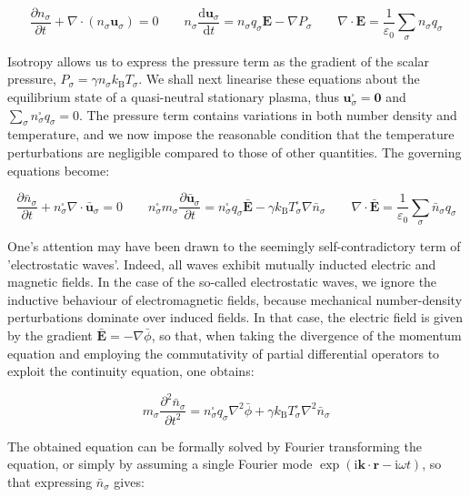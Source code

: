 \begin{equation}
    \frac{\partial n_\sigma}{\partial t}+\nabla\cdot(n_\sigma\mathbf{u}_\sigma)=0\qquad n_\sigma\frac{\mathrm{d}\mathbf{u}_\sigma}{\mathrm{d}t}=n_\sigma q_\sigma\mathbf{E}-\nabla P_\sigma\qquad\nabla\cdot\mathbf{E}=\frac{1}{\varepsilon_0}\sum_{\sigma}n_\sigma q_\sigma
\end{equation}

Isotropy allows us to express the pressure term as the gradient of the scalar pressure, $P_\sigma=\gamma n_\sigma k_\mathrm{B}T_\sigma$. We shall next linearise these equations about the equilibrium state of a quasi-neutral stationary plasma, thus $\mathbf{u}_\sigma^\square=\mathbf{0}$ and $\sum_\sigma n_\sigma^\square q_\sigma=0$. The pressure term contains variations in both number density and temperature, and we now impose the reasonable condition that the temperature perturbations are negligible compared to those of other quantities. The governing equations become:

\begin{equation}
    \frac{\partial\bar{n}_\sigma}{\partial t}+n_\sigma^\square\nabla\cdot\bar{\mathbf{u}}_\sigma=0\qquad n_\sigma^\square m_\sigma\frac{\partial\bar{\mathbf{u}}_\sigma}{\partial t}=n_\sigma^\square q_\sigma\bar{\mathbf{E}}-\gamma k_\mathrm{B}T_\sigma^\square\nabla\bar{n}_\sigma\qquad\nabla\cdot\bar{\mathbf{E}}=\frac{1}{\varepsilon_0}\sum_{\sigma}\bar{n}_\sigma q_\sigma
\end{equation}

One's attention may have been drawn to the seemingly self-contradictory term of 'electrostatic waves'. Indeed, all waves exhibit mutually inducted electric and magnetic fields. In the case of the so-called electrostatic waves, we ignore the inductive behaviour of electromagnetic fields, because mechanical number-density perturbations dominate over induced fields. In that case, the electric field is given by the gradient $\bar{\mathbf{E}}=-\nabla\bar{\phi}$, so that, when taking the divergence of the momentum equation and employing the commutativity of partial differential operators to exploit the continuity equation, one obtains:

\begin{equation}
    m_\sigma\frac{\partial^2\bar{n}_\sigma}{\partial t^2}=n_\sigma^\square q_\sigma\nabla^2\bar{\phi}+\gamma k_\mathrm{B}T_\sigma^\square\nabla^2\bar{n}_\sigma
\end{equation}

The obtained equation can be formally solved by Fourier transforming the equation, or simply by assuming a single Fourier mode $\exp{(\mathrm{i}\mathbf{k}\cdot\mathbf{r}-\mathrm{i}\omega t)}$, so that expressing $\bar{n}_\sigma$ gives:

